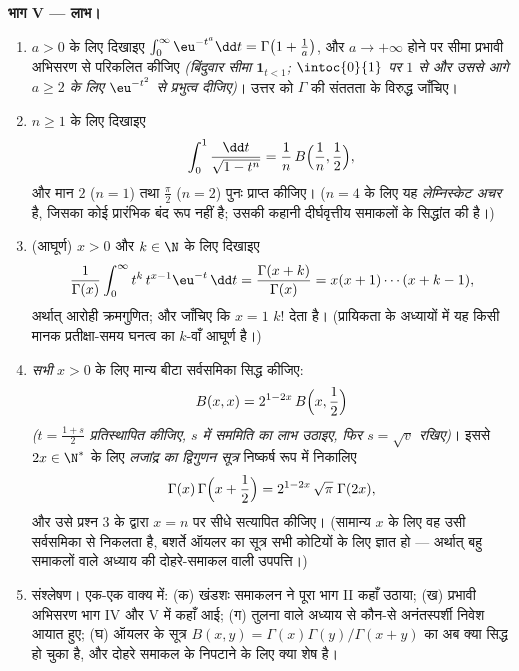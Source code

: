 \begin{problem}
\medskip
\noindent\textbf{भाग V --- लाभ।}
\begin{enumerate}[resume]
  \item $a > 0$ के लिए दिखाइए $\int_0^\infty \eu^{-t^a}\dd t =
        \Gamma\bigl(1 + \frac1a\bigr)$, और $a \to +\infty$ होने पर सीमा प्रभावी अभिसरण से
        परिकलित कीजिए \emph{(बिंदुवार सीमा $\mathbf 1_{t < 1}$; $\intoc{0}{1}$ पर $1$ से और उससे
        आगे $a \geq
        2$ के लिए $\eu^{-t^2}$ से प्रभुत्व दीजिए)}। उत्तर को $\Gamma$ की संततता
        के विरुद्ध जाँचिए।
  \item $n \geq 1$ के लिए दिखाइए
        \[
        \int_0^1 \frac{\dd t}{\sqrt{1 - t^n}}
        = \frac1n\,B\Bigl(\frac1n, \frac12\Bigr),
        \]
        और मान $2$ ($n = 1$) तथा $\frac\pi2$ ($n
        = 2$) पुनः प्राप्त कीजिए। ($n = 4$ के
        लिए यह \emph{लेम्निस्केट अचर} है, जिसका कोई प्रारंभिक बंद रूप
        नहीं है; उसकी कहानी दीर्घवृत्तीय समाकलों के सिद्धांत की है।)
  \item (आघूर्ण) $x > 0$ और $k \in \N$ के लिए दिखाइए
        \[
        \frac{1}{\Gamma(x)}\int_0^\infty
        t^{k}\,t^{x-1}\eu^{-t}\,\dd t
        = \frac{\Gamma(x+k)}{\Gamma(x)}
        = x(x+1)\cdots(x+k-1),
        \]
        अर्थात् आरोही क्रमगुणित; और जाँचिए कि $x = 1$ $k!$ देता है।
        (प्रायिकता के अध्यायों में यह किसी मानक प्रतीक्षा-समय घनत्व का
        $k$-वाँ आघूर्ण है।)
  \item \emph{सभी} $x > 0$ के लिए मान्य बीटा सर्वसमिका सिद्ध कीजिए:
        \[
        B(x, x) = 2^{1-2x}\,B\Bigl(x, \frac12\Bigr)
        \]
        \emph{($t = \frac{1+s}2$ प्रतिस्थापित कीजिए, $s$ में सममिति का लाभ उठाइए,
        फिर $s = \sqrt v$ रखिए)}। इससे $2x \in \N^*$ के लिए \emph{लजांद्र का द्विगुणन
        सूत्र} निष्कर्ष रूप में निकालिए
        \[
        \Gamma(x)\,\Gamma\Bigl(x + \frac12\Bigr)
        = 2^{1-2x}\,\sqrt\pi\;\Gamma(2x),
        \]
        और उसे प्रश्न 3 के द्वारा $x = n$ पर सीधे सत्यापित कीजिए।
        (सामान्य $x$ के लिए वह उसी सर्वसमिका से निकलता है, बशर्ते
        ऑयलर का सूत्र सभी कोटियों के लिए ज्ञात हो --- अर्थात् बहु
        समाकलों वाले अध्याय की दोहरे-समाकल वाली उपपत्ति।)
  \item संश्लेषण। एक-एक वाक्य में: (क) खंडशः समाकलन ने पूरा भाग II कहाँ
        उठाया; (ख) प्रभावी अभिसरण भाग IV और V में कहाँ आई; (ग) तुलना
        वाले अध्याय से कौन-से अनंतस्पर्शी निवेश आयात हुए; (घ) ऑयलर के
        सूत्र $B(x,y) = \Gamma(x)\Gamma(y)/\Gamma(x+y)$ का अब क्या सिद्ध हो चुका है, और दोहरे समाकल के
        निपटाने के लिए क्या शेष है।
\end{enumerate}
\end{problem}
